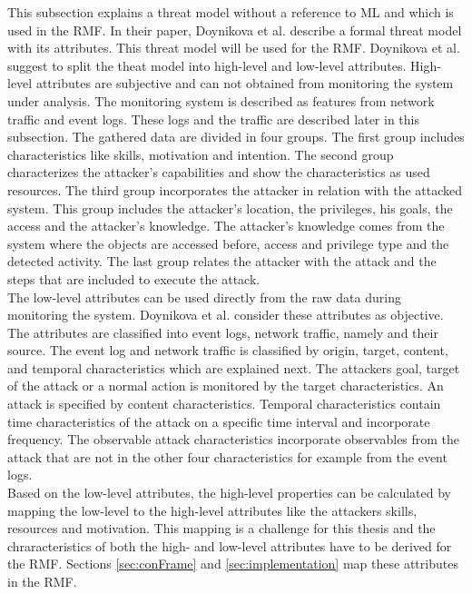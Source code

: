 This subsection explains a threat model without a reference to ML and which is used in the RMF. In their paper, Doynikova et al. \cite{DBLP:conf/crisis/DoynikovaNGK20} describe a formal threat model with its attributes. This threat model will be used for the RMF. Doynikova et al. suggest to split the theat model into high-level and low-level attributes.
High-level attributes are subjective and can not obtained from monitoring the system under analysis. The monitoring system is described as features from network traffic and event logs. These logs and the traffic are described later in this subsection. The gathered data are divided in four groups. The first group includes characteristics like
skills, motivation and intention. The second group characterizes the attacker's capabilities and show the characteristics as used resources. The third group incorporates the attacker in
relation with the attacked system. This group includes the attacker's location, the privileges, his goals, the access and the attacker's knowledge. The attacker's knowledge comes from the
system where the objects are accessed before, access and privilege type and the detected activity. The last group relates the attacker with the attack and the steps that are included to
execute the attack. \\
The low-level attributes can be used directly from the raw data during monitoring the system. Doynikova et al. consider these attributes as objective. The attributes are classified into event logs, network traffic, namely and their source. The event log and network traffic is classified by origin, target, content, and temporal characteristics \cite{DBLP:journals/ijcysa/FraunholzKAS17} which are explained next. The attackers
goal, target of the attack or a normal action is monitored by the target characteristics. An attack is specified by content characteristics. Temporal
characteristics contain time characteristics of the attack on a specific time interval and incorporate frequency. The observable attack characteristics incorporate observables from the attack that are not in the other four characteristics for example from the event logs. \\
Based on the low-level attributes, the high-level properties can be calculated by mapping the low-level to the high-level attributes like the attackers skills, resources and motivation. This mapping is a challenge for this thesis and the chraracteristics of both the high- and low-level attributes have to be derived for the RMF. Sections \ref{sec:conFrame} and \ref{sec:implementation} map these attributes in the RMF.

